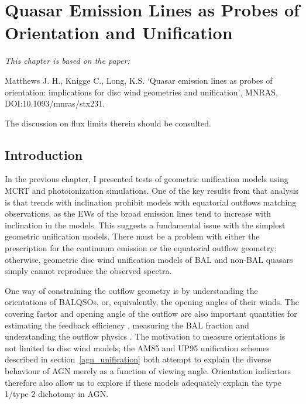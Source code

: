 \chapter{Quasar Emission Lines as Probes of Orientation and Unification}



{\em This chapter is based on the paper:

Matthews J. H., Knigge C., Long, K.S. 
`Quasar emission lines as probes of orientation: 
implications for disc wind geometries and unification',
MNRAS, DOI:10.1093/mnras/stx231.

The discussion on flux limits therein should be consulted.
}


%
%
\maketitle

\section{Introduction}

In the previous chapter, I presented tests of geometric unification
models using MCRT and photoionization simulations. 
One of the key results from that analysis is that trends with
inclination prohibit models with equatorial outflows matching
observations, as the EWs of the broad emission lines tend
to increase with inclination in the models. 
This suggests a fundamental issue with the simplest geometric 
unification models. There must be a problem with either the prescription for the 
continuum emission or the equatorial outflow geometry; otherwise,
geometric disc wind unification models of BAL and non-BAL quasars simply 
cannot reproduce the observed spectra.

One way of constraining the outflow geometry 
is by understanding the orientations
of BALQSOs, or, equivalently, the opening angles of their winds.
The covering factor and opening angle of the outflow
are also important quantities for estimating the
feedback efficiency \citep[e.g.][]{borguet2012}, measuring
the BAL fraction \citep[e.g.][]{krolikvoit1998}
and understanding the outflow physics \citep[e.g.][]{proga2005}. 
The motivation to measure orientations is not limited to disc wind models; the
AM85 and UP95 unification schemes described in section~\ref{agn_unification}
both attempt to explain the diverse behaviour of AGN merely as a function of viewing 
angle. Orientation indicators therefore also allow us to explore if these models
adequately explain the type 1/type 2 dichotomy in AGN.


